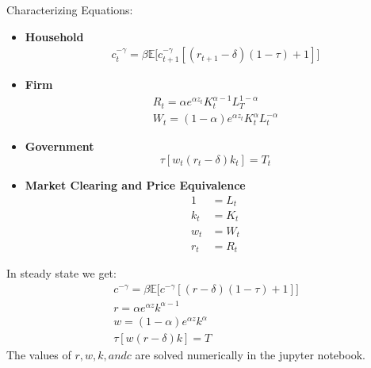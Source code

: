\documentclass[12pt]{article}
\newenvironment{problem}[2][Problem]{\begin{trivlist}
\item[\hskip \labelsep {\bfseries #1}\hskip \labelsep {\bfseries #2.}]}{\end{trivlist}}
\theoremstyle{definition}
\theoremstyle{definition}
\theoremstyle{definition}
\theoremstyle{definition}
\begin{document}
\begin{problem}{5} Characterizing Equations:
\begin{itemize}
\item \textbf{Household}
\begin{align}
c_t^{-\gamma} = \beta \mathbb{E} \big[ c_{t+1}^{-\gamma}[(r_{t+1}-\delta)(1-\tau) +1] \big]
\end{align}

\item \textbf{Firm}
\begin{align}
R_t = \alpha e^{\alpha z_t} K_t^{\alpha - 1} L_T^{1-\alpha} \\
W_t = (1 - \alpha) e^{\alpha z_t} K_t^\alpha L_t^{- \alpha}
\end{align}

\item \textbf{Government}
\begin{equation}
\tau[w_t(r_t - \delta)k_t] = T_t
\end{equation}
\item \textbf{Market Clearing and Price Equivalence}
\begin{align}
1 &= L_t \\
k_t &= K_t \\
w_t &= W_t \\
r_t &= R_t 
\end{align}

\end{itemize}
In steady state we get:
\begin{align}
c^{-\gamma} = \beta \mathbb{E} \big[ c^{-\gamma}[(r-\delta)(1-\tau)+1] \big] \\
r = \alpha e^{\alpha z} k^{\alpha - 1} \\
w = (1 - \alpha) e^{\alpha z} k^\alpha \\
\tau[w(r - \delta)k] = T
\end{align}
The values of $r, w, k, and c$ are solved numerically in the jupyter notebook.
\end{problem}
\end{document}
